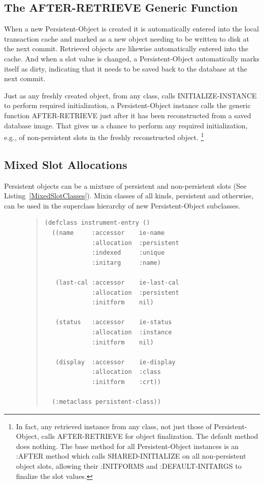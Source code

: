 \documentclass[article,oneside]{memoir}
\begin{document}
\subsection{The {\ttfamily AFTER-RETRIEVE} Generic Function}

When a new {\ttfamily Persistent-Object} is created it is automatically entered into the local transaction cache and marked as a new object needing to be written to disk at the next commit. Retrieved objects are likewise automatically entered into the cache. And when a slot value is changed, a {\ttfamily Persistent-Object} automatically marks itself as dirty, indicating that it needs to be saved back to the database at the next commit.

Just as any freshly created object, from any class, calls {\ttfamily INITIALIZE-INSTANCE} to perform required initialization, a {\ttfamily Persistent-Object} instance calls the generic function {\ttfamily AFTER-RETRIEVE} just after it has been reconstructed from a saved database image. That gives us a chance to perform any required initialization, e.g., of non-persistent slots in the freshly reconstructed object. 
\footnote{In fact, any retrieved instance from any class, not just those of {\ttfamily Persistent-Object}, calls {\ttfamily AFTER-RETRIEVE} for object finalization. The default method does nothing. The base method for all {\ttfamily Persistent-Object} instances is an {\ttfamily :AFTER} method which calls {\ttfamily SHARED-INITIALIZE} on all non-persistent object slots, allowing their {\ttfamily :INITFORMS} and {\ttfamily :DEFAULT-INITARGS} to finalize the slot values.}

\subsection{Mixed Slot Allocations}

Persistent objects can be a mixture of persistent and non-persistent slots (See Listing~\ref{MixedSlotClasses}). Mixin classes of all kinds, persistent and otherwise, can be used in the superclass hierarchy of new {\ttfamily Persistent-Object} subclasses.

\begin{figure}[!htbp]
\begin{quote}
\lstset{language=Lisp,caption=Defining mixed-slot classes,label=MixedSlotClasses}
\begin{lstlisting}
(defclass instrument-entry ()
  ((name     :accessor    ie-name
             :allocation  :persistent
             :indexed     :unique
             :initarg     :name)
                 
   (last-cal :accessor    ie-last-cal
             :allocation  :persistent
             :initform    nil)
				  
   (status   :accessor    ie-status
             :allocation  :instance
             :initform    nil)

   (display  :accessor    ie-display
             :allocation  :class
             :initform    :crt))
		         
  (:metaclass persistent-class))
\end{lstlisting}
\end{quote}
\end{figure}
\end{document}
